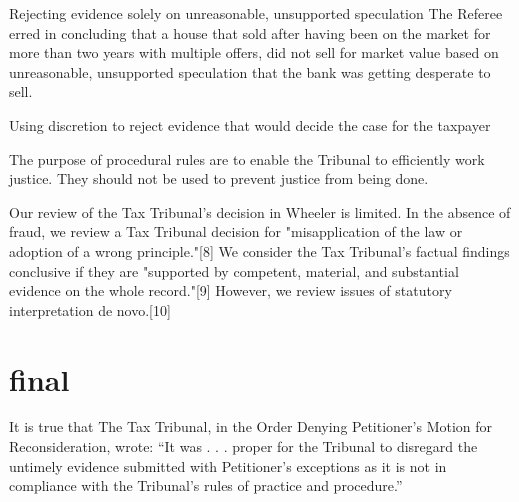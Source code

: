Rejecting evidence solely on unreasonable, unsupported speculation 
The Referee erred in concluding that a house that sold after having been on the market for more than two years with multiple offers, did not sell for market value based on unreasonable, unsupported speculation that the bank was getting desperate to sell. 
 
Using discretion to reject evidence that would decide the case for the taxpayer 


The purpose of procedural rules are to enable the Tribunal to efficiently work justice. They should not be used to prevent justice from being done.





Our review of the Tax Tribunal's decision in Wheeler is limited. In the absence of fraud, we review a Tax Tribunal decision for "misapplication of the law or adoption of a wrong principle."[8] We consider the Tax Tribunal's factual findings conclusive if they are "supported by competent, material, and substantial evidence on the whole record."[9] However, we review issues of statutory interpretation de novo.[10]












\section{final}

It is true that 
The Tax Tribunal, in the Order Denying Petitioner's Motion for Reconsideration, wrote: ``It was . . . proper for the Tribunal to disregard the untimely evidence submitted with Petitioner's exceptions as it is not in compliance with the Tribunal's rules of practice and procedure.''


